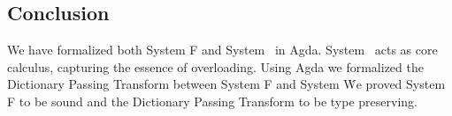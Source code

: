 \subsection{Conclusion}
We have formalized both System F and System \Fo\ in Agda. 
System \Fo\ acts as core calculus, capturing the essence of overloading.
Using Agda we formalized the Dictionary Passing Transform between System F and System \Fo\. 
We proved System F to be sound and the Dictionary Passing Transform to be type preserving.